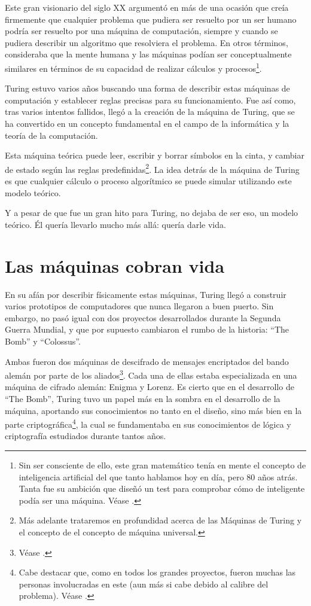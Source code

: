 Este gran visionario del siglo XX argumentó en más de una ocasión que creía firmemente que cualquier problema que pudiera ser resuelto por un ser humano podría ser resuelto por una máquina de computación, siempre y cuando 
se pudiera describir un algoritmo que resolviera el problema. En otros términos, consideraba que la mente humana y las máquinas podían ser conceptualmente similares en términos de su capacidad de realizar cálculos y 
procesos\footnote{Sin ser consciente de ello, este gran matemático tenía en mente el concepto de inteligencia artificial del que tanto hablamos hoy en día, pero 80 años atrás. 
Tanta fue su ambición que diseñó un test para comprobar cómo de inteligente podía ser una máquina. Véase \cite{turing1950computing}.}.

Turing estuvo varios años buscando una forma de describir estas máquinas de computación y establecer reglas precisas para su funcionamiento. Fue así como, tras varios intentos fallidos,
llegó a la creación de la máquina de Turing, que se ha convertido en un concepto fundamental en el campo de la informática y la teoría de la computación.

Esta máquina teórica puede leer, escribir y borrar símbolos en la cinta, y cambiar de estado según las reglas predefinidas\footnote{Más adelante trataremos en profundidad acerca de las Máquinas de Turing y el concepto de
el concepto de máquina universal.}. La idea detrás de la máquina de Turing es que cualquier cálculo o proceso 
algorítmico se puede simular utilizando este modelo teórico. 

Y a pesar de que fue un gran hito para Turing, no dejaba de ser eso, un modelo teórico. Él quería llevarlo mucho más allá: quería darle vida.

\section{Las máquinas cobran vida}

En su afán por describir físicamente estas máquinas, Turing llegó a construir varios prototipos de computadores que nunca llegaron a buen puerto. Sin embargo, no pasó igual con dos proyectos desarrollados 
durante la Segunda Guerra Mundial, y que por supuesto cambiaron el rumbo de la historia: ``The Bomb'' y ``Colossus''.

Ambas fueron dos máquinas de descifrado de mensajes encriptados del bando alemán por parte de los aliados\footnote{Véase \cite{davis2000universal}.}. Cada una de ellas estaba especializada en una máquina de cifrado alemán: Enigma y Lorenz. Es cierto
que en el desarrollo de ``The Bomb'', Turing tuvo un papel más en la sombra en el desarrollo de la máquina, aportando sus conocimientos no tanto en el diseño, sino más bien en la parte 
criptográfica\footnote{Cabe destacar que, como en todos los grandes proyectos, fueron muchas las personas involucradas en este (aun más si cabe debido al calibre del problema). Véase \cite{sale2015enigma}.}, la cual se fundamentaba en sus conocimientos de lógica y criptografía estudiados durante tantos años.

